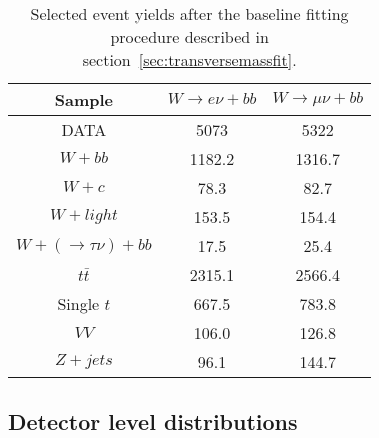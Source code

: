 \begin{table}[htb]
\begin{center}
\begin{tabular}{|c|c|c|}
\hline
\textbf{Sample} & $W \rightarrow e \nu + bb$ & $W \rightarrow \mu \nu + bb$ \\ 
\hline
DATA        & 5073   & 5322 \\
\hline             
$W + bb$    & 1182.2 & 1316.7 \\
$W + c$     & 78.3   & 82.7 \\
$W + light$ & 153.5  & 154.4 \\
$W + (\rightarrow \tau \nu) + bb$  & 17.5 & 25.4 \\
$t\bar{t}$  & 2315.1 & 2566.4 \\
Single $t$  & 667.5  & 783.8 \\
$VV$        & 106.0  & 126.8 \\
$Z + jets$  & 96.1   & 144.7 \\
\hline
\end{tabular}
\end{center}
\caption{Selected event yields after the baseline fitting procedure described in 
  section~\ref{sec:transversemassfit}.} 
\label{tab:yieldsPostfit}
\end{table}



\subsection{Detector level distributions}
\label{sec:detectorlevel}

